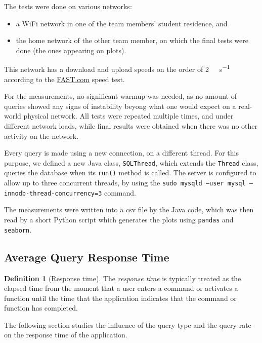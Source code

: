 \documentclass[journal]{IEEEtran}
\theoremstyle{definition}
\newtheorem{defn}{Definition}[section]
\newcommand{\py}[1]{\texttt{#1}}
\newcommand{\java}[1]{\texttt{#1}}
\begin{document}
The tests were done on various networks:
\begin{itemize}
	\item a WiFi network in one of the team members' student residence, and
	\item the home network of the other team member, on which the final tests were done (the ones appearing on plots).
\end{itemize}
This network has a download and upload speeds on the order of \SI{2}{\mega\bit\per\second} according to the \href{https://fast.com/en/gb}{\url{FAST.com}} speed test.

For the measurements, no significant warmup was needed, as no amount of queries showed any signs of instability beyong what one would expect on a real-world physical network.
All tests were repeated multiple times, and under different network loads, while final results were obtained when there was no other activity on the network.

Every query is made using a new connection, on a different thread.
For this purpose, we defined a new Java class, \java{SQLThread}, which extends the \java{Thread} class, queries the database when its \java{run()} method is called.
The server is configured to allow up to three concurrent threads, by using the \texttt{sudo mysqld --user mysql --innodb-thread-concurrency=3} command.

The measurements were written into a csv file by the Java code, which was then read by a short Python script which generates the plots using \py{pandas} and \py{seaborn}.

\subsection{Average Query Response Time}
\begin{defn}[Response time]
	The \emph{response time} is typically treated as the elapsed time from the moment that a user enters a command or activates a function until the time that the application indicates that the command or function has completed.
\end{defn}

The following section studies the influence of the query type and the query rate on the response time of the application.
\end{document}

